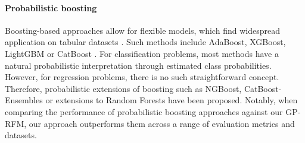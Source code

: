 \paragraph{Probabilistic boosting}
Boosting-based approaches \citep{freund1995desicion,friedman2001greedy} allow for flexible models, which find widespread application on tabular datasets \citep{shwartz2022tabular,grinsztajn2022tree,mcelfresh2023neural}. Such methods include AdaBoost, XGBoost, LightGBM or CatBoost \citep{chen2016xgboost,ke2017lightgbm,prokhorenkova2018catboost}. For classification problems, most methods have a natural probabilistic interpretation through estimated class probabilities. However, for regression problems, there is no such straightforward concept. Therefore, probabilistic extensions of boosting such as NGBoost, CatBoost-Ensembles \citep{duan2020ngboost,malinin2021uncertainty} or extensions to Random Forests \citep{schlosser2019distributional,shaker2020aleatoric} have been proposed. Notably, when comparing the performance of probabilistic boosting approaches against our GP-RFM, our approach outperforms them across a range of evaluation metrics and datasets.
% 
%
%










